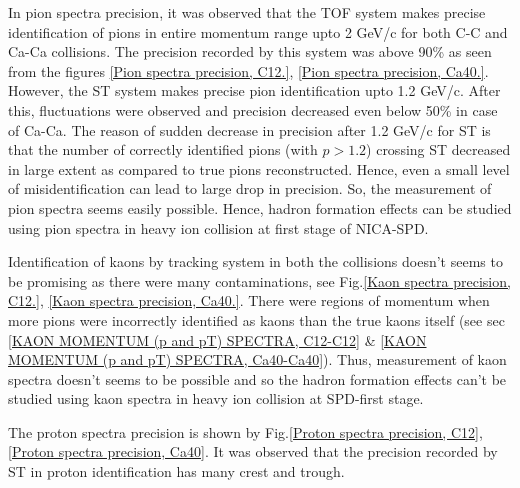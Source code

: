 \documentclass[12pt, twocolumn]{article}
\begin{document}
In pion spectra precision, it was observed that the TOF system makes precise identification of pions in entire momentum range upto 2 GeV/c for both C-C and Ca-Ca collisions. The precision recorded by this system was above 90\% as seen from the figures \ref{Pion spectra precision, C12.}, \ref{Pion spectra precision, Ca40.}. However, the ST system makes precise pion identification upto 1.2 GeV/c. After this, fluctuations were observed and precision decreased even below 50\% in case of Ca-Ca. The reason of sudden decrease in precision after 1.2  GeV/c for ST is that the number of correctly identified pions (with $p > 1.2$) crossing ST decreased in large extent as compared to true pions reconstructed. Hence, even a small level of misidentification can lead to large drop in precision. So, the measurement of pion spectra seems easily possible. Hence, hadron formation effects can be studied using pion spectra in heavy ion collision at first stage of NICA-SPD.

Identification of kaons by tracking system in both the collisions doesn't seems to be promising as there were many contaminations, see Fig.\ref{Kaon spectra precision, C12.}, \ref{Kaon spectra precision, Ca40.}. There were regions of momentum when more pions were incorrectly identified as kaons than the true kaons itself (see sec \ref{KAON MOMENTUM (p and pT) SPECTRA, C12-C12} \& \ref{KAON MOMENTUM (p and pT) SPECTRA, Ca40-Ca40}). Thus, measurement of kaon spectra doesn't seems to be possible and so the hadron formation effects can't be studied using kaon spectra in heavy ion collision at SPD-first stage.

The proton spectra precision is shown by Fig.\ref{Proton spectra precision, C12}, \ref{Proton spectra precision, Ca40}. It was observed that the precision recorded by ST in proton identification has many crest and trough.

\clearpage


\end{document}
